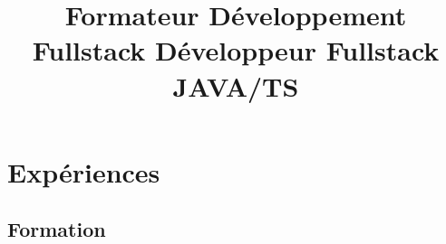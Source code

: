 \documentclass[10pt,a4paper,sans]{moderncv}        %
\title{
    Formateur Développement Fullstack \newline
	Développeur Fullstack JAVA/TS
}                               %
\begin{document}
\makecvtitle
\section{Expériences}
\subsection{Formation}
\end{document}
